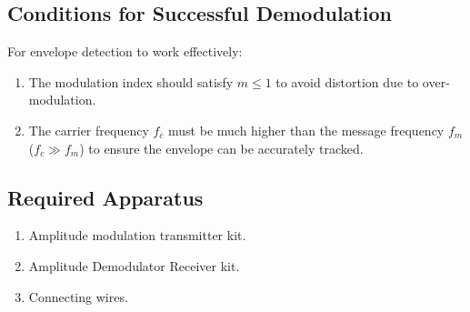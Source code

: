 \documentclass[a4paper,12pt]{article}
\begin{document}
\subsection{Conditions for Successful Demodulation}
For envelope detection to work effectively:
\begin{enumerate}
	\item The modulation index should satisfy \( m \leq 1 \) to avoid distortion due to over-modulation.
	\item The carrier frequency \( f_c \) must be much higher than the message frequency \( f_m \) (\( f_c \gg f_m \)) to ensure the envelope can be accurately tracked.
\end{enumerate}

\subsection{Required Apparatus}
	\begin{enumerate}

	\item	Amplitude modulation transmitter kit.
	\item	Amplitude Demodulator Receiver kit.
	\item Connecting wires.
\end{enumerate}

\newpage
\end{document}
